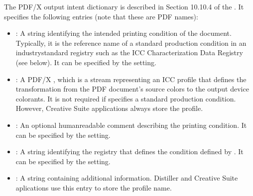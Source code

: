 \documentclass[letterpaper,12pt,english,openany,oneside]{sphinxmanual}
\begin{document}
The PDF/X output intent dictionary is described in Section 10.10.4 of the  . It specifies the following entries (note that these are PDF names):
\begin{itemize}
\item {} 
 : A string identifying the intended printing condition of the document. Typically, it is the reference name of a standard production condition in an industry\sphinxhyphen{}standard registry such as the ICC Characterization Data Registry (see  below). It can be specified by the  setting.

\item {} 
 : A PDF/X  , which is a stream representing an ICC profile that defines the transformation from the PDF document’s source colors to the output device colorants. It is not required if  specifies a standard production condition. However, Creative Suite applications always store the profile.

\item {} 
 : An optional human\sphinxhyphen{}readable comment describing the printing condition. It can be specified by the  setting.

\item {} 
 : A string identifying the registry that defines the condition defined by  . It can be specified by the  setting.

\item {} 
 : A string containing additional information. Distiller and Creative Suite aplications use this entry to store the profile name.

\end{itemize}
\end{document}
